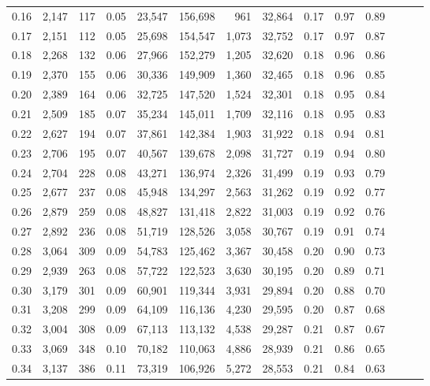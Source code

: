 \begin{tabular}{rrrrrrrrrrrrrr}
0.16 &  2,147 &  117 &  0.05 &   23,547 &  156,698 &     961 &  32,864 &  0.17 &  0.97 &      0.89 \\
0.17 &  2,151 &  112 &  0.05 &   25,698 &  154,547 &   1,073 &  32,752 &  0.17 &  0.97 &      0.87 \\
0.18 &  2,268 &  132 &  0.06 &   27,966 &  152,279 &   1,205 &  32,620 &  0.18 &  0.96 &      0.86 \\
0.19 &  2,370 &  155 &  0.06 &   30,336 &  149,909 &   1,360 &  32,465 &  0.18 &  0.96 &      0.85 \\
0.20 &  2,389 &  164 &  0.06 &   32,725 &  147,520 &   1,524 &  32,301 &  0.18 &  0.95 &      0.84 \\
0.21 &  2,509 &  185 &  0.07 &   35,234 &  145,011 &   1,709 &  32,116 &  0.18 &  0.95 &      0.83 \\
0.22 &  2,627 &  194 &  0.07 &   37,861 &  142,384 &   1,903 &  31,922 &  0.18 &  0.94 &      0.81 \\
0.23 &  2,706 &  195 &  0.07 &   40,567 &  139,678 &   2,098 &  31,727 &  0.19 &  0.94 &      0.80 \\
0.24 &  2,704 &  228 &  0.08 &   43,271 &  136,974 &   2,326 &  31,499 &  0.19 &  0.93 &      0.79 \\
0.25 &  2,677 &  237 &  0.08 &   45,948 &  134,297 &   2,563 &  31,262 &  0.19 &  0.92 &      0.77 \\
0.26 &  2,879 &  259 &  0.08 &   48,827 &  131,418 &   2,822 &  31,003 &  0.19 &  0.92 &      0.76 \\
0.27 &  2,892 &  236 &  0.08 &   51,719 &  128,526 &   3,058 &  30,767 &  0.19 &  0.91 &      0.74 \\
0.28 &  3,064 &  309 &  0.09 &   54,783 &  125,462 &   3,367 &  30,458 &  0.20 &  0.90 &      0.73 \\
0.29 &  2,939 &  263 &  0.08 &   57,722 &  122,523 &   3,630 &  30,195 &  0.20 &  0.89 &      0.71 \\
0.30 &  3,179 &  301 &  0.09 &   60,901 &  119,344 &   3,931 &  29,894 &  0.20 &  0.88 &      0.70 \\
0.31 &  3,208 &  299 &  0.09 &   64,109 &  116,136 &   4,230 &  29,595 &  0.20 &  0.87 &      0.68 \\
0.32 &  3,004 &  308 &  0.09 &   67,113 &  113,132 &   4,538 &  29,287 &  0.21 &  0.87 &      0.67 \\
0.33 &  3,069 &  348 &  0.10 &   70,182 &  110,063 &   4,886 &  28,939 &  0.21 &  0.86 &      0.65 \\
0.34 &  3,137 &  386 &  0.11 &   73,319 &  106,926 &   5,272 &  28,553 &  0.21 &  0.84 &      0.63 \\

\end{tabular}
